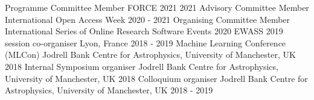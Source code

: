 \begin{cvpress}
    \cvpres
   {Programme Committee Member}
    {FORCE 2021}
    {2021}
    \cvpres
   {Advisory Committee Member}
    {International Open Access Week}
    {2020 - 2021}
    \cvpres
   {Organising Committee Member}
    {International Series of Online Research Software Events}
    {2020}
   \cvpres
   {EWASS 2019 session co-organiser}
    {Lyon, France}
    {2018 - 2019}
   \cvpres
   {Machine Learning Conference (MLCon)}
    {Jodrell Bank Centre for Astrophysics, University of Manchester, UK}
    {2018}
   \cvpres
   {Internal Symposium organiser}
    {Jodrell Bank Centre for Astrophysics, University of Manchester, UK}
    {2018}
   \cvpres
   {Colloquium organiser}
    {Jodrell Bank Centre for Astrophysics, University of Manchester, UK}
    {2018 - 2019}
\end{cvpress}


